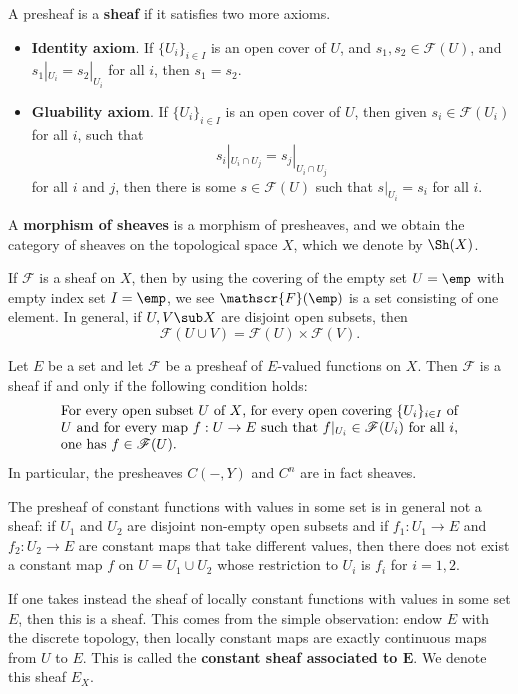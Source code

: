 \begin{definition}
A presheaf is a \textbf{sheaf} if it satisfies two more axioms.
\begin{itemize}
\item \textbf{Identity axiom}. If $\{U_i\}_{i\in I}$ is an open cover of $U$, and $s_1,s_2\in\mathscr{F}(U)$, and $s_1|_{U_i}=s_2|_{U_i}$ for all $i$, then $s_1=s_2$.
\item \textbf{Gluability axiom}. If $\{U_i\}_{i\in I}$ is an open cover of $U$, then given $s_i\in\mathscr{F}(U_i)$ for all $i$, such that 
\[s_i|_{U_i\cap U_j}=s_j|_{U_i\cap U_j}\]
for all $i$ and $j$, then there is some $s\in\mathscr{F}(U)$ such that $s|_{U_i}=s_i$ for all $i$.
\end{itemize}
A \textbf{morphism of sheaves} is a morphism of presheaves, and we obtain the category of sheaves on the topological space $X$, which we denote by $\Sh(X)$.
\end{definition}
\begin{remark}
If $\mathscr{F}$ is a sheaf on $X$, then by using the covering of the empty set $U=\emp$ with empty index set $I=\emp$, we see $\mathscr{F}(\emp)$ is a set consisting of one element. In general, if $U,V\sub X$ are disjoint open subsets, then
\[\mathscr{F}(U\cup V)=\mathscr{F}(U)\times\mathscr{F}(V).\]
\end{remark}
\begin{example}\label{sheaf of E-valued function eg}
Let $E$ be a set and let $\mathscr{F}$ be a presheaf of $E$-valued functions on $X$. Then $\mathscr{F}$ is a sheaf if and only if the following condition holds:
\begin{equation*}
\parbox{\dimexpr\linewidth-6em}
{\strut
For every open subset $U$ of $X$, for every open covering $\{U_i\}_{i\in I}$ of $U$ and for every map $f:U\to E$ such that $f|_{U_i}\in\mathscr{F}(U_i)$ for all $i$, one has $f\in\mathscr{F}(U)$.
\strut}
\end{equation*}
In particular, the presheaves $C(-,Y)$ and $C^n$ are in fact sheaves.
\end{example}
\begin{example}
The presheaf of constant functions with values in some set is in general not a sheaf: if $U_1$ and $U_2$ are disjoint non-empty open subsets and if $f_1:U_1\to E$ and $f_2:U_2\to E$ are constant maps that take different values, then there does not exist a constant map $f$ on $U=U_1\cup U_2$ whose restriction to $U_i$ is $f_i$ for $i=1,2$.\par 
If one takes instead the sheaf of locally constant functions with values in some set $E$, then this is a sheaf. This comes from the simple observation: endow $E$ with the discrete topology, then locally constant maps are exactly continuous maps from $U$ to $E$. This is called the \textbf{constant sheaf associated to $\bm{E}$}. We denote this sheaf $E_X$.
\end{example}
